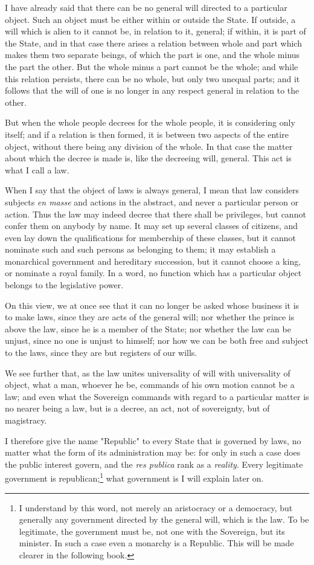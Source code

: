 \documentclass[12pt]{report}
\begin{document}
I have already said that there can be no general will directed to a particular object. Such an object must be either within or outside the State. If outside, a will which is alien to it cannot be, in relation to it, general; if within, it is part of the State, and in that case there arises a relation between whole and part which makes them two separate beings, of which the part is one, and the whole minus the part the other. But the whole minus a part cannot be the whole; and while this relation persists, there can be no whole, but only two unequal parts; and it follows that the will of one is no longer in any respect general in relation to the other.

But when the whole people decrees for the whole people, it is considering only itself; and if a relation is then formed, it is between two aspects of the entire object, without there being any division of the whole. In that case the matter about which the decree is made is, like the decreeing will, general. This act is what I call a law.

When I say that the object of laws is always general, I mean that law considers subjects \textit{en masse} and actions in the abstract, and never a particular person or action. Thus the law may indeed decree that there shall be privileges, but cannot confer them on anybody by name. It may set up several classes of citizens, and even lay down the qualifications for membership of these classes, but it cannot nominate such and such persons as belonging to them; it may establish a monarchical government and hereditary succession, but it cannot choose a king, or nominate a royal family. In a word, no function which has a particular object belongs to the legislative power.

On this view, we at once see that it can no longer be asked whose business it is to make laws, since they are acts of the general will; nor whether the prince is above the law, since he is a member of the State; nor whether the law can be unjust, since no one is unjust to himself; nor how we can be both free and subject to the laws, since they are but registers of our wills.

We see further that, as the law unites universality of will with universality of object, what a man, whoever he be, commands of his own motion cannot be a law; and even what the Sovereign commands with regard to a particular matter is no nearer being a law, but is a decree, an act, not of sovereignty, but of magistracy.

I therefore give the name "Republic" to every State that is governed by laws, no matter what the form of its administration may be: for only in such a case does the public interest govern, and the \textit{res publica} rank as a \textit{reality}. Every legitimate government is republican;\footnote{I understand by this word, not merely an aristocracy or a democracy, but generally any government directed by the general will, which is the law. To be legitimate, the government must be, not one with the Sovereign, but its minister. In such a case even a monarchy is a Republic. This will be made clearer in the following book.} what government is I will explain later on.
\end{document}
